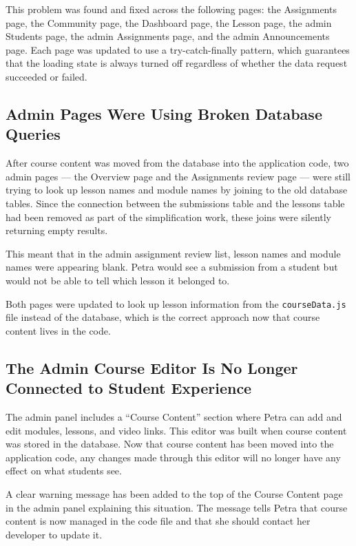 \documentclass[12pt, a4paper]{article}
\begin{document}
This problem was found and fixed across the following pages: the Assignments page, the Community page, the Dashboard page, the Lesson page, the admin Students page, the admin Assignments page, and the admin Announcements page. Each page was updated to use a try-catch-finally pattern, which guarantees that the loading state is always turned off regardless of whether the data request succeeded or failed.

\subsection{Admin Pages Were Using Broken Database Queries}

After course content was moved from the database into the application code, two admin pages --- the Overview page and the Assignments review page --- were still trying to look up lesson names and module names by joining to the old database tables. Since the connection between the submissions table and the lessons table had been removed as part of the simplification work, these joins were silently returning empty results.

This meant that in the admin assignment review list, lesson names and module names were appearing blank. Petra would see a submission from a student but would not be able to tell which lesson it belonged to.

Both pages were updated to look up lesson information from the \texttt{courseData.js} file instead of the database, which is the correct approach now that course content lives in the code.

\subsection{The Admin Course Editor Is No Longer Connected to Student Experience}

The admin panel includes a ``Course Content'' section where Petra can add and edit modules, lessons, and video links. This editor was built when course content was stored in the database. Now that course content has been moved into the application code, any changes made through this editor will no longer have any effect on what students see.

A clear warning message has been added to the top of the Course Content page in the admin panel explaining this situation. The message tells Petra that course content is now managed in the code file and that she should contact her developer to update it.
\end{document}
